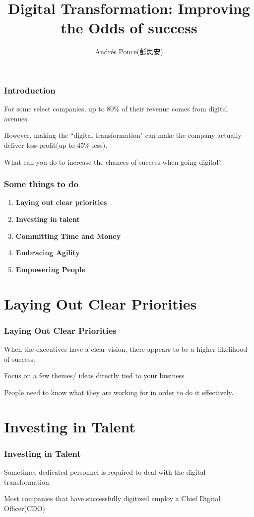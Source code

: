 \documentclass{beamer}
\title{Digital Transformation: Improving the Odds of success}
\author{Andr\'es Ponce(彭思安)}
\institute{National Chiao Tung University}
\begin{document}
\maketitle

\begin{frame}
	\frametitle{Introduction}
	For some select companies, up to 80\% of their revenue comes
	from digital avenues.\pause

	However, making the ``digital transformation" can make the company 
	actually deliver less profit(up to 45\% less).\pause

	What can you do to increase the chances of success when going digital?
\end{frame}

\begin{frame}
	\frametitle{Some things to do}
		\begin{enumerate}
			\item{\textbf{Laying out clear priorities}}\pause
			\item{\textbf{Investing in talent}}\pause
			\item{\textbf{Committing Time and Money}}\pause
			\item{\textbf{Embracing Agility}}\pause
			\item{\textbf{Empowering People}}
		\end{enumerate}
\end{frame}

\section{Laying Out Clear Priorities}
\begin{frame}
	\frametitle{Laying Out Clear Priorities}
	When the executives have a clear vision, there appears
	to be a higher likelihood of success.\pause

	Focus on a few themes/ ideas directly tied to your 
	business\pause

	People need to know what they are working for in order to 
	do it effectively.
\end{frame}

\section{Investing in Talent}
\begin{frame}
	\frametitle{Investing in Talent}
	Sometimes dedicated personnel is required to deal with 
	the digital transformation.\pause

	Most companies that have successfully 
	digitized employ a  Chief Digital Officer(CDO) 
\end{frame}
\end{document}

